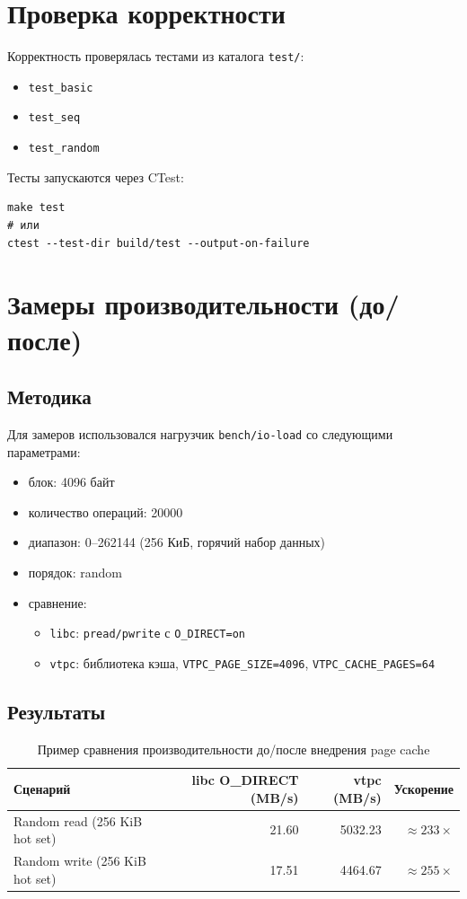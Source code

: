 \documentclass[12pt,a4paper]{article}
\begin{document}
\section{Проверка корректности}
Корректность проверялась тестами из каталога \texttt{test/}:
\begin{itemize}
  \item \texttt{test\_basic}
  \item \texttt{test\_seq}
  \item \texttt{test\_random}
\end{itemize}

Тесты запускаются через CTest:
\begin{lstlisting}
make test
# или
ctest --test-dir build/test --output-on-failure
\end{lstlisting}

\section{Замеры производительности (до/после)}
\subsection{Методика}
Для замеров использовался нагрузчик \texttt{bench/io-load} со следующими параметрами:
\begin{itemize}
  \item блок: 4096 байт
  \item количество операций: 20000
  \item диапазон: 0--262144 (256 КиБ, горячий набор данных)
  \item порядок: random
  \item сравнение:
    \begin{itemize}
      \item \texttt{libc}: \texttt{pread/pwrite} с \texttt{O\_DIRECT=on}
      \item \texttt{vtpc}: библиотека кэша, \texttt{VTPC\_PAGE\_SIZE=4096}, \texttt{VTPC\_CACHE\_PAGES=64}
    \end{itemize}
\end{itemize}

\subsection{Результаты}
\begin{table}[h!]
  \centering
  \begin{tabular}{@{}lrrr@{}}
    \toprule
    Сценарий & libc O\_DIRECT (MB/s) & vtpc (MB/s) & Ускорение \\
    \midrule
    Random read (256 KiB hot set)  & 21.60  & 5032.23 & \(\approx 233\times\) \\
    Random write (256 KiB hot set) & 17.51  & 4464.67 & \(\approx 255\times\) \\
    \bottomrule
  \end{tabular}
  \caption{Пример сравнения производительности до/после внедрения page cache}
\end{table}
\end{document}
